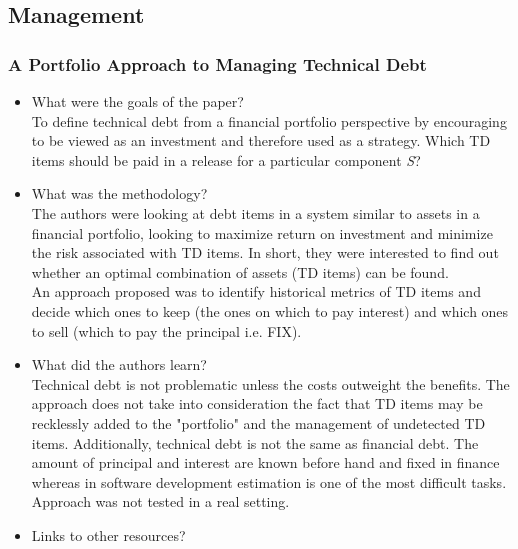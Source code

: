 \documentclass{mprop}
\begin{document}
\subsection{Management}

\subsubsection{A Portfolio Approach to Managing Technical Debt} \cite{Guo2011}

\begin{itemize}
	\item What were the goals of the paper?\\
	      To define technical debt from a financial portfolio perspective by encouraging to be viewed as an investment and therefore used as a strategy.
	      Which TD items should be paid in a release for a particular component \textit{S}?
	\item What was the methodology?\\
	      The authors were looking at debt items in a system similar to assets in a financial portfolio, looking to maximize return on investment and minimize the risk associated with TD items.
	      In short, they were interested to find out whether an optimal combination of assets (TD items) can be found. \\
	      An approach proposed was to identify historical metrics of TD items and decide which ones to keep (the ones on which to pay interest) and which ones to sell (which to pay the principal i.e. FIX).
	\item What did the authors learn? \\
	      Technical debt is not problematic unless the costs outweight the benefits.
	      The approach does not take into consideration the fact that TD items may be recklessly added to the "portfolio" and the management of undetected TD items.
	      Additionally, technical debt is not the same as financial debt. The amount of principal and interest are known before hand and fixed in finance whereas in software development estimation is one of the most difficult tasks.
	      Approach was not tested in a real setting.
	\item Links to other resources?
\end{itemize}
\end{document}
